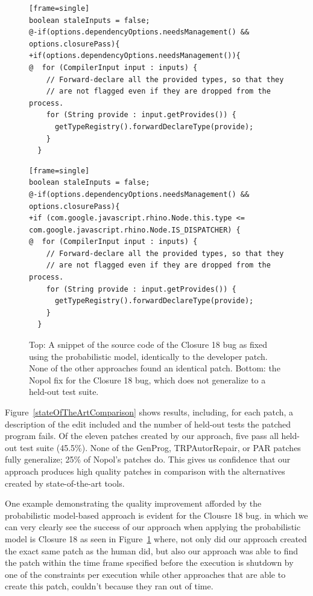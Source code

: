 \documentclass[conference]{IEEEtran}
\begin{document}
\begin{figure}[t]
\begin{lstlisting}[firstnumber=1284][frame=single]
boolean staleInputs = false;
@-if(options.dependencyOptions.needsManagement() && options.closurePass){
+if(options.dependencyOptions.needsManagement()){
@  for (CompilerInput input : inputs) {
    // Forward-declare all the provided types, so that they
    // are not flagged even if they are dropped from the process.
    for (String provide : input.getProvides()) {
      getTypeRegistry().forwardDeclareType(provide);
    }  
  }
	\end{lstlisting}


\begin{lstlisting}[firstnumber=1284][frame=single]
boolean staleInputs = false;
@-if(options.dependencyOptions.needsManagement() && options.closurePass){
+if (com.google.javascript.rhino.Node.this.type <= com.google.javascript.rhino.Node.IS_DISPATCHER) {
@  for (CompilerInput input : inputs) {
    // Forward-declare all the provided types, so that they
    // are not flagged even if they are dropped from the process.
    for (String provide : input.getProvides()) {
      getTypeRegistry().forwardDeclareType(provide);
    }  
  }
	\end{lstlisting}

	\caption{Top: A snippet of the source code of the Closure 18 bug as fixed using the
      probabilistic model, identically to the developer patch. None of the other
      approaches found an identical patch.  Bottom: the Nopol fix for the
      Closure 18 bug, which does not generalize to a held-out test
      suite.\label{closure18prob}}
\end{figure}


Figure~\ref{stateOfTheArtComparison} shows
results, including, for each patch, a description of the edit included and
the number of held-out tests the patched program fails. Of the
 eleven patches created by our approach, 
five pass all held-out test suite (45.5\%). None of the GenProg,
TRPAutorRepair, or PAR patches fully generalize; 25\% of Nopol's patches do.
This gives us confidence that our approach produces high
quality patches in comparison with the alternatives created by state-of-the-art
tools. 

One example demonstrating the quality improvement afforded by the probabilistic
model-based approach is evident for the Clousre 18 bug.  in which we can very clearly see the success of our approach when
applying the probabilistic model is Closure 18 as seen in
Figure~\ref{closure18prob} where, not only did our approach created the exact
same patch as the human did, but also our approach was able to find the patch
within the time frame specified before the execution is shutdown by one of the
constraints per execution while other approaches that are able to create this
patch, couldn't because they ran out of time.
\end{document}

